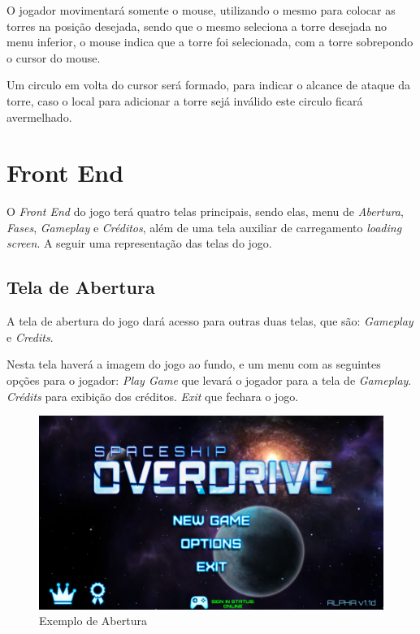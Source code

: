 \documentclass[11pt]{article} %
\begin{document}
O jogador movimentará somente o mouse, utilizando o mesmo para colocar as torres na posição desejada, sendo que o mesmo seleciona a torre desejada no menu inferior, o mouse indica que a torre foi selecionada, com a torre sobrepondo o cursor do mouse.

Um circulo em volta do cursor será formado, para indicar o alcance de ataque da torre, caso o local para adicionar a torre sejá inválido este circulo ficará avermelhado.  

\newpage

\section{Front End}

O \textit{Front End} do jogo terá  quatro telas principais, sendo elas, menu de \textit{Abertura}, \textit{Fases}, \textit{Gameplay} e \textit{Créditos}, além de uma tela auxiliar de carregamento \textit{loading screen}. A seguir uma representação das telas do jogo.

\subsection{Tela de Abertura}
A tela de abertura do jogo dará acesso para outras duas telas, que são: \textit{Gameplay} e \textit{Credits}.

Nesta tela haverá a imagem do jogo ao fundo, e um menu com as seguintes opções para o jogador: 
\textit{Play Game} que levará o jogador para a tela de \textit{Gameplay}.
\textit{Crédits} para exibição dos créditos.
\textit{Exit} que fechara o jogo.

\begin{figure}[!htp]
\centering
\includegraphics[scale=0.4]{res/abertura.png}
\caption{Exemplo de Abertura}
\label{Abertura}
\end{figure}
\end{document}
